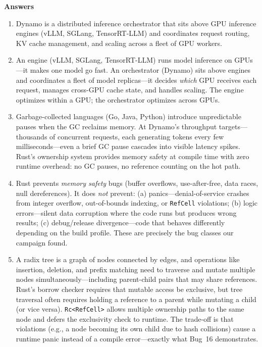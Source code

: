\medskip
\noindent\textbf{Answers}

\begin{enumerate}
  \item Dynamo is a distributed inference orchestrator that sits above GPU inference engines (vLLM, SGLang, TensorRT-LLM) and coordinates request routing, KV cache management, and scaling across a fleet of GPU workers.

  \item An engine (vLLM, SGLang, TensorRT-LLM) runs model inference on GPUs---it makes one model go fast. An orchestrator (Dynamo) sits above engines and coordinates a fleet of model replicas---it decides \emph{which} GPU receives each request, manages cross-GPU cache state, and handles scaling. The engine optimizes within a GPU; the orchestrator optimizes across GPUs.

  \item Garbage-collected languages (Go, Java, Python) introduce unpredictable pauses when the GC reclaims memory. At Dynamo's throughput targets---thousands of concurrent requests, each generating tokens every few milliseconds---even a brief GC pause cascades into visible latency spikes. Rust's ownership system provides memory safety at compile time with zero runtime overhead: no GC pauses, no reference counting on the hot path.

  \item Rust prevents \emph{memory safety} bugs (buffer overflows, use-after-free, data races, null dereferences). It does \emph{not} prevent: (a) panics---denial-of-service crashes from integer overflow, out-of-bounds indexing, or \texttt{RefCell} violations; (b) logic errors---silent data corruption where the code runs but produces wrong results; (c) debug/release divergence---code that behaves differently depending on the build profile. These are precisely the bug classes our campaign found.

  \item A radix tree is a graph of nodes connected by edges, and operations like insertion, deletion, and prefix matching need to traverse and mutate multiple nodes simultaneously---including parent-child pairs that may share references. Rust's borrow checker requires that mutable access be exclusive, but tree traversal often requires holding a reference to a parent while mutating a child (or vice versa). \texttt{Rc<RefCell>} allows multiple ownership paths to the same node and defers the exclusivity check to runtime. The trade-off is that violations (e.g., a node becoming its own child due to hash collisions) cause a runtime panic instead of a compile error---exactly what Bug~16 demonstrates.


\end{enumerate}
